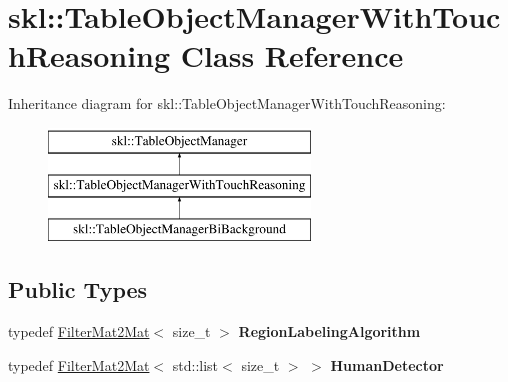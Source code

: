 \hypertarget{classskl_1_1_table_object_manager_with_touch_reasoning}{}\section{skl\+:\+:Table\+Object\+Manager\+With\+Touch\+Reasoning Class Reference}
\label{classskl_1_1_table_object_manager_with_touch_reasoning}
Inheritance diagram for skl\+:\+:Table\+Object\+Manager\+With\+Touch\+Reasoning\+:\begin{figure}[H]
\begin{center}
\leavevmode
\includegraphics[height=3.000000cm]{classskl_1_1_table_object_manager_with_touch_reasoning}
\end{center}
\end{figure}
\subsection*{Public Types}
\begin{DoxyCompactItemize}
\item 
\hypertarget{classskl_1_1_table_object_manager_with_touch_reasoning_a3573af855f4889f4c2a8278450877766}{}\label{classskl_1_1_table_object_manager_with_touch_reasoning_a3573af855f4889f4c2a8278450877766} 
typedef \hyperlink{classskl_1_1_filter_mat2_mat}{Filter\+Mat2\+Mat}$<$ size\+\_\+t $>$ {\bfseries Region\+Labeling\+Algorithm}
\item 
\hypertarget{classskl_1_1_table_object_manager_with_touch_reasoning_a58a45db7b8f42581caf6ad84cb920a97}{}\label{classskl_1_1_table_object_manager_with_touch_reasoning_a58a45db7b8f42581caf6ad84cb920a97} 
typedef \hyperlink{classskl_1_1_filter_mat2_mat}{Filter\+Mat2\+Mat}$<$ std\+::list$<$ size\+\_\+t $>$ $>$ {\bfseries Human\+Detector}
\end{DoxyCompactItemize}
